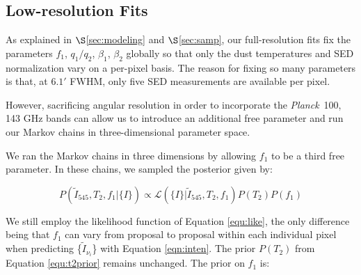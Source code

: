 \documentclass{emulateapj}
\newcommand{\PLANCK}{{\it Planck}}
\begin{document}


\subsection{Low-resolution Fits}
\label{sec:lores}

As explained in $\S$\ref{sec:modeling} and $\S$\ref{sec:samp}, our 
full-resolution fits fix the parameters $f_1$, $q_1/q_2$, $\beta_1$, $\beta_2$ 
globally so that only the dust temperatures and SED normalization vary on a 
per-pixel basis. The reason for fixing so many parameters is that, at $6.1'$
FWHM, only five SED measurements are available per pixel.


However, sacrificing angular resolution in order to incorporate 
the \PLANCK~100, 143 GHz bands can allow us to introduce an additional free 
parameter and run our Markov chains in three-dimensional parameter space.

We ran the Markov chains in three dimensions by allowing 
$f_1$ to be a third free parameter. In these chains, we sampled the posterior
given by:

\begin{equation}
\label{eqn:f1post}
P(\tilde{I}_{545}, T_2, f_1|\{I\}) \propto \mathcal{L}(\{I\}|\tilde{I}_{545}, T_2, f_1)P(T_2)P(f_1)
\end{equation}

We still employ the likelihood function of Equation \ref{equ:like}, the only
difference being that $f_1$ can vary from proposal to proposal within each 
individual pixel when predicting \{$\tilde{I}_{\nu_i}$\} with Equation 
\ref{eqn:inten}. The prior $P(T_2)$ from Equation \ref{equ:t2prior} remains 
unchanged. The prior on $f_1$ is:
\end{document}
